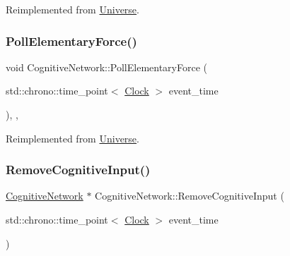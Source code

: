 Reimplemented from \mbox{\hyperlink{classUniverse_a645299738e6b798a037f2a15a2e7cf4d}{Universe}}.

\mbox{\label{classCognitiveNetwork_ac97c08a0af7dc0d02fbe059827b6be87}} 
\subsubsection{\texorpdfstring{Poll\+Elementary\+Force()}{PollElementaryForce()}}
{\footnotesize\ttfamily void Cognitive\+Network\+::\+Poll\+Elementary\+Force (\begin{DoxyParamCaption}\item[{std\+::chrono\+::time\+\_\+point$<$ \mbox{\hyperlink{universe_8h_a0ef8d951d1ca5ab3cfaf7ab4c7a6fd80}{Clock}} $>$}]{event\+\_\+time }\end{DoxyParamCaption})\hspace{0.3cm}{\ttfamily [inline]}, {\ttfamily [final]}, {\ttfamily [virtual]}}



Reimplemented from \mbox{\hyperlink{classUniverse_a0c485c504542409cbb5cfd8543c35b11}{Universe}}.

\mbox{\label{classCognitiveNetwork_af79bf7f8b61d5392df7a87bd444eb550}} 
\subsubsection{\texorpdfstring{Remove\+Cognitive\+Input()}{RemoveCognitiveInput()}}
{\footnotesize\ttfamily \mbox{\hyperlink{classCognitiveNetwork}{Cognitive\+Network}} $\ast$ Cognitive\+Network\+::\+Remove\+Cognitive\+Input (\begin{DoxyParamCaption}\item[{std\+::chrono\+::time\+\_\+point$<$ \mbox{\hyperlink{universe_8h_a0ef8d951d1ca5ab3cfaf7ab4c7a6fd80}{Clock}} $>$}]{event\+\_\+time }\end{DoxyParamCaption})}

\mbox{\label{classCognitiveNetwork_aaaf93e7c732b1e1e81060f82ff73c93a}} 
